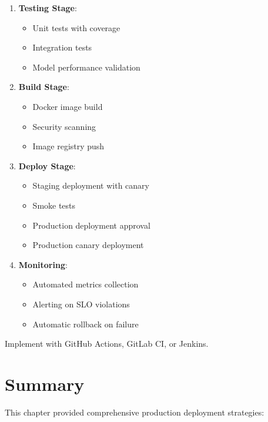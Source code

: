 \begin{enumerate}
    \item \textbf{Testing Stage}:
    \begin{itemize}
        \item Unit tests with coverage
        \item Integration tests
        \item Model performance validation
    \end{itemize}

    \item \textbf{Build Stage}:
    \begin{itemize}
        \item Docker image build
        \item Security scanning
        \item Image registry push
    \end{itemize}

    \item \textbf{Deploy Stage}:
    \begin{itemize}
        \item Staging deployment with canary
        \item Smoke tests
        \item Production deployment approval
        \item Production canary deployment
    \end{itemize}

    \item \textbf{Monitoring}:
    \begin{itemize}
        \item Automated metrics collection
        \item Alerting on SLO violations
        \item Automatic rollback on failure
    \end{itemize}
\end{enumerate}

Implement with GitHub Actions, GitLab CI, or Jenkins.

\section{Summary}

This chapter provided comprehensive production deployment strategies:

